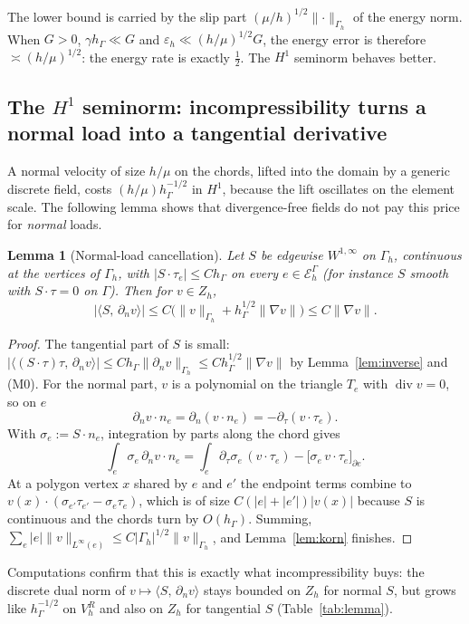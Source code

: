 \documentclass[pdflatex,sn-mathphys-num]{sn-jnl}
\theoremstyle{thmstyleone}
\newtheorem{lemma}[theorem]{Lemma}
\theoremstyle{thmstylethree}
\newcommand{\hG}{h_\Gamma}
\newcommand{\Gh}{\Gamma_h}
\newcommand{\EG}{\mathcal E_h^\Gamma}
\newcommand{\VR}{V_h^R}
\newcommand{\Zh}{Z_h}
\newcommand{\dn}{\partial_n}
\newcommand{\dt}{\partial_\tau}
\newcommand{\ip}[2]{\langle #1,\, #2\rangle}
\newcommand{\norm}[1]{\lVert #1\rVert}
\newcommand{\eps}{\varepsilon_h}
\renewcommand{\div}{\operatorname{div}}
\begin{document}
The lower bound is carried by the slip part $(\mu/h)^{1/2}\norm{\cdot}_{\Gh}$ of the energy norm. When $G>0$, $\gamma\hG\ll G$ and $\eps\ll(h/\mu)^{1/2}G$, the energy error is therefore $\asymp(h/\mu)^{1/2}$: the energy rate is exactly $\frac12$. The $H^1$ seminorm behaves better.

\subsection{The \texorpdfstring{$H^1$}{H1} seminorm: incompressibility turns a normal load into a tangential derivative}
A normal velocity of size $h/\mu$ on the chords, lifted into the domain by a generic discrete field, costs $(h/\mu)\hG^{-1/2}$ in $H^1$, because the lift oscillates on the element scale. The following lemma shows that divergence-free fields do not pay this price for \emph{normal} loads.

\begin{lemma}[Normal-load cancellation]\label{lem:cancel}
Let $S$ be edgewise $W^{1,\infty}$ on $\Gh$, continuous at the vertices of $\Gh$, with $|S\cdot\tau_e|\le C\hG$ on every $e\in\EG$ (for instance $S$ smooth with $S\cdot\tau=0$ on $\Gamma$). Then for $v\in\Zh$,
\[
|\ip{S}{\dn v}|\le C\bigl(\norm{v}_{\Gh}+\hG^{1/2}\norm{\nabla v}\bigr)\le C\norm{\nabla v}.
\]
\end{lemma}

\begin{proof}
The tangential part of $S$ is small: $|\ip{(S\cdot\tau)\tau}{\dn v}|\le C\hG\norm{\dn v}_{\Gh}\le C\hG^{1/2}\norm{\nabla v}$ by Lemma~\ref{lem:inverse} and (M0). For the normal part, $v$ is a polynomial on the triangle $T_e$ with $\div v=0$, so on $e$
\[
\dn v\cdot n_e=\dn(v\cdot n_e)=-\dt(v\cdot\tau_e).
\]
With $\sigma_e:=S\cdot n_e$, integration by parts along the chord gives
\[
\int_e\sigma_e\,\dn v\cdot n_e=\int_e\dt\sigma_e\,(v\cdot\tau_e)-\bigl[\sigma_e\,v\cdot\tau_e\bigr]_{\partial e}.
\]
At a polygon vertex $x$ shared by $e$ and $e'$ the endpoint terms combine to $v(x)\cdot(\sigma_{e'}\tau_{e'}-\sigma_e\tau_e)$, which is of size $C(|e|+|e'|)|v(x)|$ because $S$ is continuous and the chords turn by $O(\hG)$. Summing, $\sum_e|e|\norm{v}_{L^\infty(e)}\le C|\Gh|^{1/2}\norm{v}_{\Gh}$, and Lemma~\ref{lem:korn} finishes.
\end{proof}

Computations confirm that this is exactly what incompressibility buys: the discrete dual norm of $v\mapsto\ip{S}{\dn v}$ stays bounded on $\Zh$ for normal $S$, but grows like $\hG^{-1/2}$ on $\VR$ and also on $\Zh$ for tangential $S$ (Table~\ref{tab:lemma}).
\end{document}
